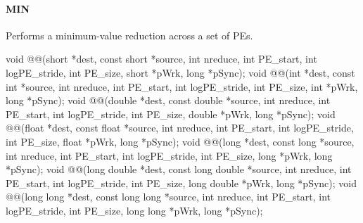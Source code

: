 \begin{apidefinition}
\paragraph{MIN}
Performs a minimum-value reduction across a set of \acp{PE}.\newline
\begin{Csynopsis}
void @@(short *dest, const short *source, int nreduce, int PE_start, int logPE_stride, int PE_size, short *pWrk, long *pSync);
void @@(int *dest, const int *source, int nreduce, int PE_start, int logPE_stride, int PE_size, int *pWrk, long *pSync);
void @@(double *dest, const double *source, int nreduce, int PE_start, int logPE_stride, int PE_size, double *pWrk, long *pSync);
void @@(float *dest, const float *source, int nreduce, int PE_start, int logPE_stride, int PE_size, float *pWrk, long *pSync);
void @@(long *dest, const long *source, int nreduce, int PE_start, int logPE_stride, int PE_size, long *pWrk, long *pSync);
void @@(long double *dest, const long double *source, int nreduce, int PE_start, int logPE_stride, int PE_size, long double *pWrk, long *pSync);
void @@(long long *dest, const long long *source, int nreduce, int PE_start, int logPE_stride, int PE_size, long long *pWrk, long *pSync);
\end{Csynopsis}


\end{apidefinition}
